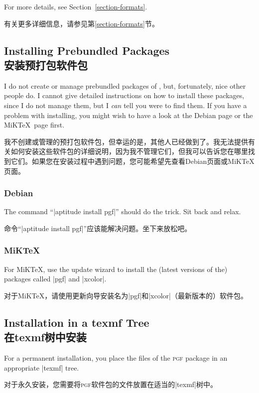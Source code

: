 For more details, see Section~\ref{section-formats}.

有关更多详细信息，请参见第\ref{section-formats}节。


\subsection{Installing Prebundled Packages\\安装预打包软件包}

I do not create or manage prebundled packages of \pgfname, but, fortunately,
nice other people do. I cannot give detailed instructions on how to install
these packages, since I do not manage them, but I \emph{can} tell you were to
find them. If you have a problem with installing, you might wish to have a look
at the Debian page or the MiK\TeX\ page first.

我不创建或管理\pgfname 的预打包软件包，但幸运的是，其他人已经做到了。我无法提供有关如何安装这些软件包的详细说明，因为我不管理它们，但我可以告诉您在哪里找到它们。如果您在安装过程中遇到问题，您可能希望先查看Debian页面或MiK\TeX 页面。


\subsubsection{Debian}

The command ``|aptitude install pgf|'' should do the trick. Sit back and relax.

命令``|aptitude install pgf|''应该能解决问题。坐下来放松吧。

\subsubsection{MiKTeX}

For MiK\TeX, use the update wizard to install the (latest versions of the)
packages called |pgf| and |xcolor|.

对于MiK\TeX，请使用更新向导安装名为|pgf|和|xcolor|（最新版本的）软件包。


\subsection{Installation in a texmf Tree\\在texmf树中安装}

For a permanent installation, you place the files of the \textsc{pgf} package
in an appropriate |texmf| tree.

对于永久安装，您需要将\textsc{pgf}软件包的文件放置在适当的|texmf|树中。


